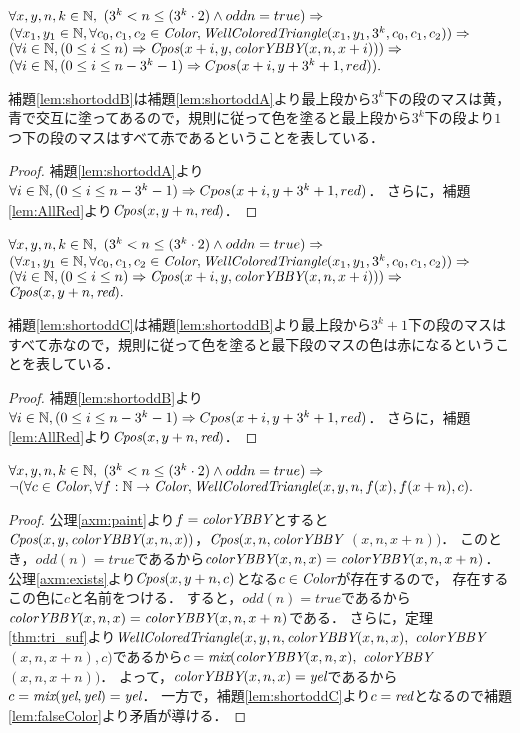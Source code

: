 \begin{lem}[\ShortOddB] \label{lem:shortoddB}
  $\forall x,y,n,k \in \mathbb{N},$
  $(3^k < n \leq (3^k\cdot2) \land odd n = true) \Rightarrow$
  $(\forall x_1,y_1 \in \mathbb{N}, \forall c_0,c_1,c_2 \in \textit{Color}, \textit{WellColoredTriangle}(x_1,y_1,3^k,c_0,c_1,c_2)) \Rightarrow$
  $(\forall i \in \mathbb{N}, (0 \leq i \leq n) \Rightarrow \textit{Cpos}(x+i,y,\textit{colorYBBY}(x,n,x+i))) \Rightarrow$
  $(\forall i \in \mathbb{N}, (0 \leq i \leq n - 3^k-1) \Rightarrow Cpos(x+i,y+3^k+1,red)).$
\end{lem}
補題\ref{lem:shortoddB}は補題\ref{lem:shortoddA}より最上段から$3^k$下の段のマスは黄，青で交互に塗ってあるので，規則に従って色を塗ると最上段から$3^k$下の段より$1$つ下の段のマスはすべて赤であるということを表している．
\begin{proof}
  補題\ref{lem:shortoddA}より$\forall i \in \mathbb{N}, (0 \leq i \leq n - 3^k-1) \Rightarrow Cpos(x+i,y+3^k+1,red)$．
  さらに，補題\ref{lem:AllRed}より$\textit{Cpos}(x,y+n,\textit{red})$．
\end{proof}

\begin{lem}[\ShortOddC] \label{lem:shortoddC}
  $\forall x,y,n,k \in \mathbb{N},$
  $(3^k < n \leq (3^k\cdot2) \land odd n = true) \Rightarrow$
  $(\forall x_1,y_1 \in \mathbb{N}, \forall c_0,c_1,c_2 \in \textit{Color}, \textit{WellColoredTriangle}(x_1,y_1,3^k,c_0,c_1,c_2)) \Rightarrow$
  $(\forall i \in \mathbb{N}, (0 \leq i \leq n) \Rightarrow \textit{Cpos}(x+i,y,\textit{colorYBBY}(x,n,x+i))) \Rightarrow$
  $\textit{Cpos}(x,y+n,\textit{red}).$
\end{lem}
補題\ref{lem:shortoddC}は補題\ref{lem:shortoddB}より最上段から$3^k+1$下の段のマスはすべて赤なので，規則に従って色を塗ると最下段のマスの色は赤になるということを表している．
\begin{proof}
  補題\ref{lem:shortoddB}より$\forall i \in \mathbb{N}, (0 \leq i \leq n - 3^k-1) \Rightarrow Cpos(x+i,y+3^k+1,red)$．
  さらに，補題\ref{lem:AllRed}より$\textit{Cpos}(x,y+n,\textit{red})$．
\end{proof}

\begin{lem}[\ShortOdd] \label{lem:shortodd}
  $\forall x,y,n,k \in \mathbb{N},$
  $(3^k < n \leq (3^k\cdot2) \land odd n = true) \Rightarrow$
  $\lnot(\forall c \in \textit{Color}, \forall f:\mathbb{N} \to \textit{Color}, \textit{WellColoredTriangle}(x,y,n,f(x),f(x+n), c).$
\end{lem}
\begin{proof}
  公理\ref{axm:paint}より$f=\textit{colorYBBY}$とすると$\textit{Cpos}(x,y,\textit{colorYBBY}(x,n,x))$，$\textit{Cpos}(x,n,\textit{colorYBBY}$ $(x,n,x+n))$．
  このとき，$odd(n)=true$であるから$\textit{colorYBBY}(x,n,x)=\textit{colorYBBY}(x,n,x+n)$．
  公理\ref{axm:exists}より$\textit{Cpos}(x,y+n,c)$となる$c\in\textit{Color}$が存在するので，
  存在するこの色に$c$と名前をつける．
  すると，$odd(n)=true$であるから$\textit{colorYBBY}(x,n,x)=\textit{colorYBBY}(x,n,x+n)$である．
  さらに，定理\ref{thm:tri_suf}より$\textit{WellColoredTriangle}(x,y,n,\textit{colorYBBY}(x,n,x),$ $\textit{colorYBBY}$ $(x,n,x+n),c)$であるから$c=\textit{mix}(\textit{colorYBBY}(x,n,x),$ $\textit{colorYBBY}$ $(x,n,x+n))$．
  よって，$\textit{colorYBBY}(x,n,x)=\textit{yel}$であるから$c=\textit{mix}(\textit{yel},\textit{yel})=\textit{yel}$．
  一方で，補題\ref{lem:shortoddC}より$c=\textit{red}$となるので補題\ref{lem:falseColor}より矛盾が導ける．
\end{proof}


